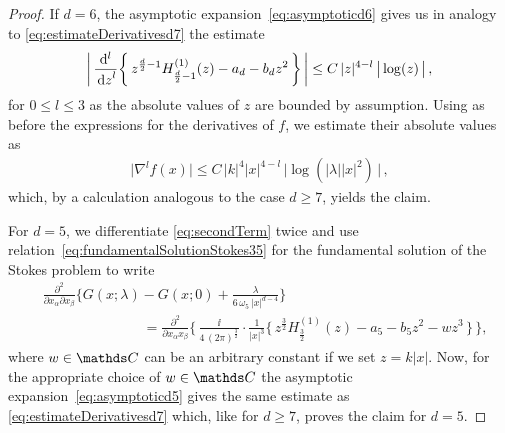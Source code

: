 \begin{proof}
If $d = 6$, the asymptotic expansion~\eqref{eq:asymptoticd6} gives us in analogy to \eqref{eq:estimateDerivativesd7} the estimate
\begin{align}
  \label{eq:estimateDerivativesd6}
  \bigg| \, \frac{\mathrm{d}^l}{\, {\operatorname{d}\!{z}}^l} \bigg\{\, z^{\frac{d}{2} - 1} H_{\frac{d}{2} - 1}^{(1)}(z) - a_d - b_d z^2 \, \bigg\}\,  \bigg| \leq C\, |z|^{4 - l} \, \big| \log(z)\, \big|\, ,
\end{align}
for $0 \leq l \leq 3$ as the absolute values of $z$ are bounded by assumption.%
Using as before the expressions for the derivatives of $f$, we estimate their absolute values as
\begin{align*}
  \big|\nabla^l f(x) \big| \leq C\, |k|^4 |x|^{4 - l}\, \big|\log(|\lambda| |x|^2)\, \big|\, , 
\end{align*}
which, by a calculation analogous to the case $d \geq 7$, yields the claim.

For $d = 5$, we differentiate \eqref{eq:secondTerm} twice and use relation~\eqref{eq:fundamentalSolutionStokes35} for the fundamental solution of the Stokes problem to  write
\begin{align*}
  &\frac{\partial^2}{\partial x_\alpha \partial x_\beta} \bigg\{ G(x; \lambda) - G(x; 0) + \frac{\lambda}{6\,\omega_5\, |x|^{d - 4}} \bigg\} \\
  &\hspace{3cm}
  = \frac{\partial^2}{\partial x_\alpha x_\beta} \Bigg\{ \, \frac{\ii}{4\, (2\pi)^{\frac{3}{2}}} \cdot \frac{1}{|x|^3} \bigg\{ \, z^{\frac{3}{2}} H_{\frac{3}{2}}^{(1)}(z) - a_5 - b_5 z^2 - w z^3\, \bigg\}\,  \Bigg\},
\end{align*}
where $w\in\C$ can be an arbitrary constant if we set $z = k|x|$.
Now, for the appropriate choice of $w \in \C$ the asymptotic expansion~\eqref{eq:asymptoticd5} gives the same estimate as \eqref{eq:estimateDerivativesd7} which, like for $d \geq 7$, proves the claim for $d = 5$.


\end{proof}

